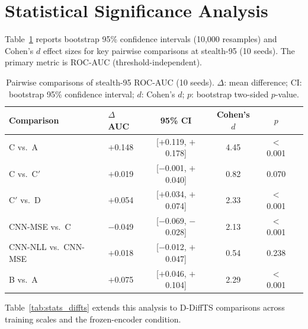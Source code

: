 \section{Statistical Significance Analysis}
\label{app:statistics}

Table~\ref{tab:stats} reports bootstrap 95\% confidence intervals
(10{,}000 resamples) and Cohen's $d$ effect sizes for key pairwise
comparisons at stealth-95 (10 seeds).  The primary metric is ROC-AUC
(threshold-independent).

\begin{table}[h]
\centering
\caption{Pairwise comparisons of stealth-95 ROC-AUC (10 seeds).
  $\Delta$: mean difference; CI: bootstrap 95\% confidence interval;
  $d$: Cohen's $d$; $p$: bootstrap two-sided $p$-value.}
\label{tab:stats}
\begin{tabular}{llcccc}
\toprule
Comparison & $\Delta$ AUC & 95\% CI & Cohen's $d$ & $p$ \\
\midrule
C vs.\ A         & $+$0.148 & [$+$0.119, $+$0.178] & 4.45 & $<$0.001 \\
C vs.\ C$'$      & $+$0.019 & [$-$0.001, $+$0.040] & 0.82 & 0.070 \\
C$'$ vs.\ D      & $+$0.054 & [$+$0.034, $+$0.074] & 2.33 & $<$0.001 \\
CNN-MSE vs.\ C   & $-$0.049 & [$-$0.069, $-$0.028] & 2.13 & $<$0.001 \\
CNN-NLL vs.\ CNN-MSE & $+$0.018 & [$-$0.012, $+$0.047] & 0.54 & 0.238 \\
B vs.\ A         & $+$0.075 & [$+$0.046, $+$0.104] & 2.29 & $<$0.001 \\
\bottomrule
\end{tabular}
\end{table}

Table~\ref{tab:stats_diffts} extends this analysis to D-DiffTS comparisons
across training scales and the frozen-encoder condition.

